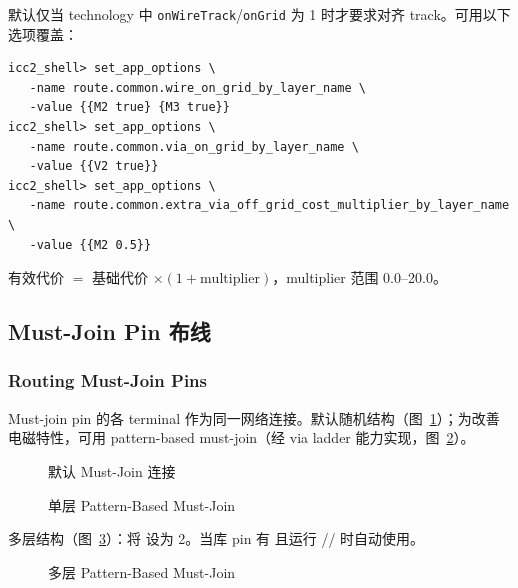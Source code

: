 默认仅当 technology 中 \texttt{onWireTrack}/\texttt{onGrid} 为 1 时才要求对齐 track。可用以下选项覆盖：
\begin{lstlisting}
icc2_shell> set_app_options \
   -name route.common.wire_on_grid_by_layer_name \
   -value {{M2 true} {M3 true}}
icc2_shell> set_app_options \
   -name route.common.via_on_grid_by_layer_name \
   -value {{V2 true}}
icc2_shell> set_app_options \
   -name route.common.extra_via_off_grid_cost_multiplier_by_layer_name \
   -value {{M2 0.5}}
\end{lstlisting}
有效代价 $=$ 基础代价 $\times (1+\mathrm{multiplier})$，multiplier 范围 0.0--20.0。

\subsection{Must-Join Pin 布线}
\subsubsection*{Routing Must-Join Pins}

Must-join pin 的各 terminal 作为同一网络连接。默认随机结构（图~\ref{fig:must-join-default}）；为改善电磁特性，可用 pattern-based must-join（经 via ladder 能力实现，图~\ref{fig:must-join-single}）。

\begin{figure}[htbp]
\centering
{}
\caption{默认 Must-Join 连接}
\label{fig:must-join-default}
\end{figure}

\begin{figure}[htbp]
\centering
{}
\caption{单层 Pattern-Based Must-Join}
\label{fig:must-join-single}
\end{figure}

多层结构（图~\ref{fig:must-join-multi}）：将  设为 2。当库 pin 有  且运行 // 时自动使用。

\begin{figure}[htbp]
\centering
{}
\caption{多层 Pattern-Based Must-Join}
\label{fig:must-join-multi}
\end{figure}

